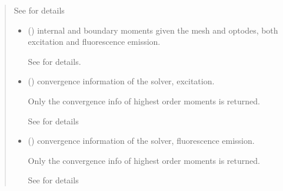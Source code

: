 \documentclass[letterpaper,10pt,english]{sphinxmanual}
\begin{document}
\begin{fulllineitems}
\begin{fulllineitems}
\begin{quote}
\begin{description}
\begin{itemize}
\sphinxAtStartPar
See {\hyperref[\detokenize{_autosummary/nirfasterff.utils.SolverOptions:nirfasterff.utils.SolverOptions}]{}} for details


\end{itemize}

\sphinxAtStartPar
\begin{itemize}
\item {} 
\sphinxAtStartPar
{} () \textendash{} internal and boundary moments given the mesh and optodes, both excitation and fluorescence emission.

\sphinxAtStartPar
See  for details.

\item {} 
\sphinxAtStartPar
{} () \textendash{} convergence information of the solver, excitation.

\sphinxAtStartPar
Only the convergence info of highest order moments is returned.

\sphinxAtStartPar
See {\hyperref[\detokenize{_autosummary/nirfasterff.utils.ConvergenceInfo:nirfasterff.utils.ConvergenceInfo}]{}} for details

\item {} 
\sphinxAtStartPar
{} () \textendash{} convergence information of the solver, fluorescence emission.

\sphinxAtStartPar
Only the convergence info of highest order moments is returned.

\sphinxAtStartPar
See {\hyperref[\detokenize{_autosummary/nirfasterff.utils.ConvergenceInfo:nirfasterff.utils.ConvergenceInfo}]{}} for details

\end{itemize}


\end{description}\end{quote}

\end{fulllineitems}



\end{fulllineitems}
\end{document}
